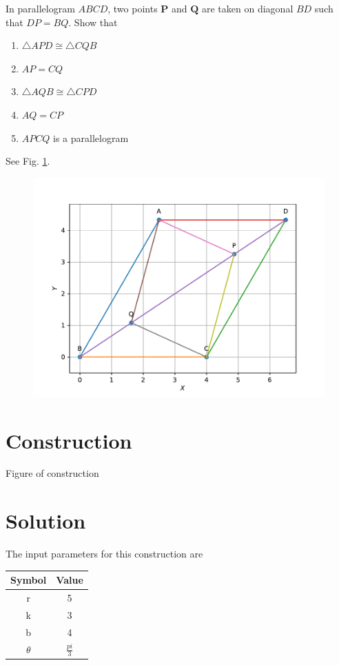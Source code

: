 \documentclass[10pt, a4paper]{article}
\title{\mytitle}
\author{\myauthor\hspace{1em}\\\contact\\FWC22011\hspace{6.5em}IITH\hspace{0.5em}\mymodule\hspace{6em}Matrix:Line}
\date{}
\let\vec\mathbf
\begin{document}
	\maketitle
	\tableofcontents
	\fi

In parallelogram $ABCD$, two points $\vec{P}$ and $\vec{Q}$ are
taken on diagonal $BD$ such that $DP = BQ$. Show that 
\begin{enumerate}
	\item  $\triangle APD \cong \triangle CQB$         
	\item  $AP = CQ$
	\item $\triangle AQB \cong \triangle CPD$     
	\item  $AQ = CP$   
	\item  $APCQ$ is a parallelogram 
\end{enumerate}
\solution 
See Fig. 
		\ref{fig:9/8/1/9}.
 	\begin{figure}
		\centering
 \includegraphics[width=\columnwidth]{chapters/9/8/1/9/figs/output.pdf}
		\caption{}
		\label{fig:9/8/1/9}
  	\end{figure}

\iffalse

\section{Construction}
  	\begin{center}
  Figure of construction
  	\end{center}

   
  \section{Solution}
\begin{center}
The input parameters for this construction are
\begin{tabular}{|c|c|}
	\hline
	\textbf{Symbol}&\textbf{Value}\\
	\hline
	r&5\\
	\hline
	k&3\\
	\hline
    b&4\\
	\hline
	$\theta$&$\frac{pi}{3}$\\
	\hline
\end{tabular}
\end{center}
\end{document}
